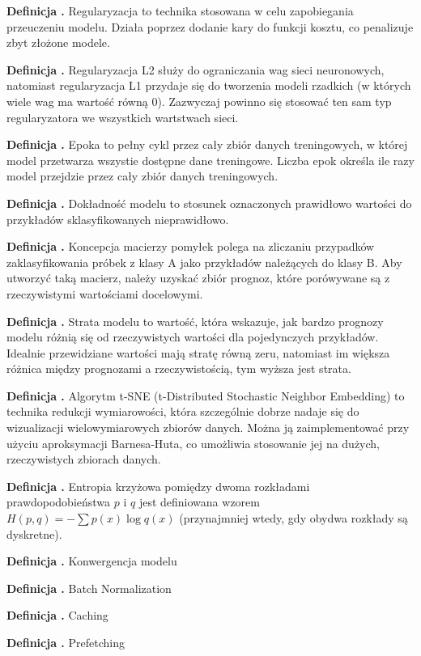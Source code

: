 \noindent
\textbf{Definicja \mlDefinitionIndex.}
\incrementMlDefinitionIndex
Regularyzacja to technika stosowana w celu zapobiegania przeuczeniu modelu.
Działa poprzez dodanie kary do funkcji kosztu, co penalizuje zbyt złożone modele.

\noindent
\textbf{Definicja \mlDefinitionIndex.}
\incrementMlDefinitionIndex
Regularyzacja L2 służy do ograniczania wag sieci neuronowych,
natomiast regularyzacja L1 przydaje się do tworzenia modeli rzadkich (w których wiele wag ma wartość równą 0). 
Zazwyczaj powinno się stosować ten sam typ regularyzatora we wszystkich wartstwach sieci.

\noindent
\textbf{Definicja \mlDefinitionIndex.}
\incrementMlDefinitionIndex
Epoka to pełny cykl przez cały zbiór danych treningowych, w której model przetwarza wszystie dostępne dane treningowe.
Liczba epok określa ile razy model przejdzie przez cały zbiór danych treningowych.

\noindent
\textbf{Definicja \mlDefinitionIndex.}
\incrementMlDefinitionIndex
Dokładność modelu to stosunek oznaczonych prawidłowo wartości do przykładów sklasyfikowanych nieprawidłowo.

\noindent
\textbf{Definicja \mlDefinitionIndex.}
\incrementMlDefinitionIndex
Koncepcja macierzy pomyłek polega na zliczaniu przypadków zaklasyfikowania próbek z klasy A jako przykładów należących do klasy B.
Aby utworzyć taką macierz, należy uzyskać zbiór prognoz, które porówywane są z rzeczywistymi wartościami docelowymi.

\noindent
\textbf{Definicja \mlDefinitionIndex.}
\incrementMlDefinitionIndex
Strata modelu to wartość, która wskazuje,
jak bardzo prognozy modelu różnią się od rzeczywistych wartości dla pojedynczych przykładów.
Idealnie przewidziane wartości mają stratę równą zeru,
natomiast im większa różnica między prognozami a rzeczywistością, tym wyższa jest strata.

\noindent
\textbf{Definicja \mlDefinitionIndex.}
\incrementMlDefinitionIndex
Algorytm t-SNE (t-Distributed Stochastic Neighbor Embedding) to technika redukcji wymiarowości,
która szczególnie dobrze nadaje się do wizualizacji wielowymiarowych zbiorów danych.
Można ją zaimplementować przy użyciu aproksymacji Barnesa-Huta,
co umożliwia stosowanie jej na dużych, rzeczywistych zbiorach danych.

\noindent
\textbf{Definicja \mlDefinitionIndex.}
\incrementMlDefinitionIndex
Entropia krzyżowa pomiędzy dwoma rozkładami prawdopodobieństwa $p$ i $q$ jest definiowana wzorem
$H(p,q) = -\sum p(x) \log q(x) $ (przynajmniej wtedy, gdy obydwa rozkłady są dyskretne).

\noindent
\textbf{Definicja \mlDefinitionIndex.}
\incrementMlDefinitionIndex
Konwergencja modelu %

\noindent
\textbf{Definicja \mlDefinitionIndex.}
\incrementMlDefinitionIndex
Batch Normalization %

\noindent
\textbf{Definicja \mlDefinitionIndex.}
\incrementMlDefinitionIndex
Caching %

\noindent
\textbf{Definicja \mlDefinitionIndex.}
\incrementMlDefinitionIndex
Prefetching %